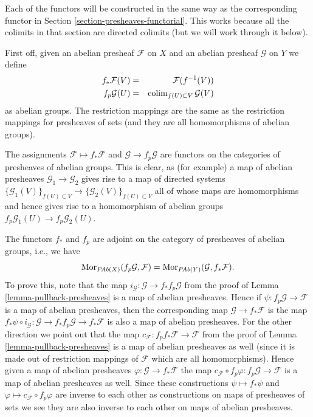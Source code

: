 \medskip\noindent
Each of the functors will be constructed in the same
way as the corresponding functor in
Section \ref{section-presheaves-functorial}.
This works because all the colimits in that section
are directed colimits (but we will work through it below).

\medskip\noindent
First off, given an abelian presheaf $\mathcal{F}$ on $X$ and
an abelian presheaf $\mathcal{G}$ on $Y$ we define
\begin{eqnarray*}
f_*\mathcal{F}(V) & = & \mathcal{F}(f^{-1}(V)) \\
f_p\mathcal{G}(U) & = & \mathop{\mathrm{colim}}\nolimits_{f(U) \subset V} \mathcal{G}(V)
\end{eqnarray*}
as abelian groups. The restriction mappings are the same as
the restriction mappings for presheaves of sets (and they are
all homomorphisms of abelian groups).

\medskip\noindent
The assignments $\mathcal{F} \mapsto f_*\mathcal{F}$ and
$\mathcal{G} \to f_p\mathcal{G}$ are functors on
the categories of presheaves of abelian groups.
This is clear, as (for example) a map of abelian presheaves
$\mathcal{G}_1 \to \mathcal{G}_2$ gives rise to a map of
directed systems
$\{\mathcal{G}_1(V)\}_{f(U) \subset V} \to
\{\mathcal{G}_2(V)\}_{f(U) \subset V}$
all of whose maps are homomorphisms
and hence gives rise to a homomorphism of abelian groups
$f_p\mathcal{G}_1(U) \to f_p\mathcal{G}_2(U)$.

\medskip\noindent
The functors $f_*$ and $f_p$ are adjoint on the
category of presheaves of abelian groups, i.e., we have
$$
\mathop{\mathrm{Mor}}\nolimits_{\textit{PAb}(X)}(f_p\mathcal{G}, \mathcal{F})
=
\mathop{\mathrm{Mor}}\nolimits_{\textit{PAb}(Y)}(\mathcal{G}, f_*\mathcal{F}).
$$
To prove this, note that the map
$i_\mathcal{G} : \mathcal{G} \to f_* f_p\mathcal{G}$ from the proof
of Lemma \ref{lemma-pullback-presheaves}
is a map of abelian presheaves. Hence if
$\psi : f_p\mathcal{G} \to \mathcal{F}$
is a map of abelian presheaves, then the corresponding map
$\mathcal{G} \to f_*\mathcal{F}$ is the map
$f_*\psi \circ i_\mathcal{G} :
\mathcal{G} \to f_* f_p \mathcal{G} \to f_* \mathcal{F}$
is also a map of abelian presheaves. For the other direction
we point out that the map
$c_\mathcal{F} : f_p f_* \mathcal{F} \to \mathcal{F}$
from the proof of Lemma \ref{lemma-pullback-presheaves} is a
map of abelian presheaves as well (since it is made out of restriction
mappings of $\mathcal{F}$ which are all homomorphisms). Hence
given a map of abelian presheaves $\varphi : \mathcal{G} \to f_*\mathcal{F}$
the map
$c_\mathcal{F} \circ f_p\varphi : f_p\mathcal{G} \to \mathcal{F}$
is a map of abelian presheaves as well. Since these constructions
$\psi \mapsto f_*\psi$ and $\varphi \mapsto c_\mathcal{F} \circ f_p\varphi$
are inverse to each other as constructions on maps of presheaves of sets
we see they are also inverse to each other on maps of abelian presheaves.

